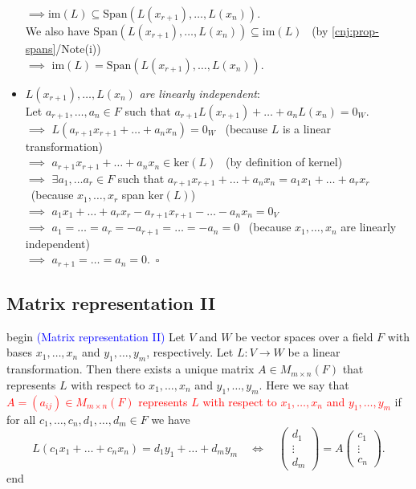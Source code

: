 \documentclass[
  12pt,
  a4paper,
  twoside]{article}
\theoremstyle{plain}
\theoremstyle{definition}
\begin{document}
\begin{itemize}
  \(\implies \mathrm{im}(L) \subseteq \mathrm{Span}(L(x_{r+1}),\dots, L(x_n))\).\\
  We also have \(\mathrm{Span}(L(x_{r+1}),\dots, L(x_n))\subseteq \mathrm{im}(L)\) \hfill~{(by \ref{cnj:prop-spans}/Note(i))}\\
  \(\implies\) \(\mathrm{im}(L) = \mathrm{Span}(L(x_{r+1}),\dots, L(x_n))\).
\item
  \(L(x_{r+1}),\dots, L(x_n)\) \emph{are linearly independent}:\\
  Let \(a_{r+1},\dots,a_n\in F\) such that \(a_{r+1}L(x_{r+1})+\dots+a_nL(x_n)=0_W\).\\
  \(\implies\) \(L(a_{r+1}x_{r+1}+\dots+ a_nx_n)=0_W\) \hfill~{(because \(L\) is a linear transformation)}\\
  \(\implies\) \(a_{r+1}x_{r+1}+\dots + a_nx_n\in\mathrm{ker}(L)\) \hfill~{(by definition of kernel)}\\
  \(\implies\) \(\exists a_1,\dots a_r\in F\) such that \(a_{r+1}x_{r+1}+\dots+a_nx_n = a_1x_1+\dots+a_rx_r\)\\
  \hspace*{0.333em}\hfill~{(because \(x_1,\dots,x_r\) span \(\mathrm{ker}(L)\))}\\
  \(\implies\) \(a_1x_1+\dots+a_rx_r-a_{r+1}x_{r+1}-\dots-a_nx_n=0_V\)\\
  \(\implies\) \(a_1=\dots=a_r=-a_{r+1}=\dots=-a_{n}=0\) \hfill~{(because \(x_1,\dots,x_n\) are linearly independent)}\\
  \(\implies\) \(a_{r+1}=\dots=a_n=0\).\hfill~{\(\square\)}
\end{itemize}

\hypertarget{ss-matrep-2}{%
\subsection{Matrix representation II}\label{ss-matrep-2}}

\csname begin\label{cnj:prop-matrep-2}
\textcolor{blue}{(Matrix representation II)}
Let \(V\) and \(W\) be vector spaces over a field \(F\) with bases \(x_{1} , \dots, x_{n}\) and \(y_{1}, \dots, y_{m}\), respectively. Let \(L: V \to W\) be a linear transformation. Then there exists a unique matrix \(A \in M_{m \times n}(F)\) that represents \(L\) with respect to \(x_{1}, \dots, x_{n}\) and \(y_{1}, \dots, y_{m}\). Here we say that \textcolor{red}{$A = (a_{ij}) \in M_{m \times n}(F)$ represents $L$ with respect to $x_{1}, \dots,  x_{n}$ and $y_{1}, \dots,  y_{m}$} if for all \(c_{1}, \dots, c_{n}, d_1, \dots, d_m \in F\) we have
\[
L(c_{1}x_{1} + \dots + c_{n}x_{n}) = d_{1}y_{1} + \dots + d_{m}y_{m}
\quad\iff\quad
\begin{pmatrix} d_{1} \\ \vdots \\ d_{m} \end{pmatrix} = A \begin{pmatrix} c_{1} \\ \vdots \\ c_{n} \end{pmatrix}.
\]
\csname end
\end{document}
